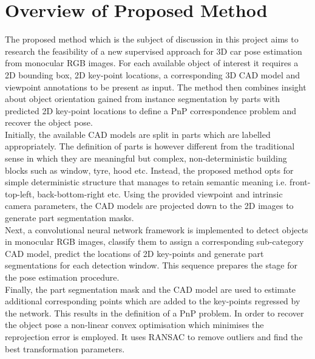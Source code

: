 \documentclass[main.tex]{subfiles}
\begin{document}
\section{Overview of Proposed Method}
\indent The proposed method which is the subject of discussion in this project aims to research the feasibility of a new supervised approach for 3D car pose estimation from monocular RGB images. For each available object of interest it requires a 2D bounding box, 2D key-point locations, a corresponding 3D CAD model and viewpoint annotations to be present as input. The method then combines insight about object orientation gained from instance segmentation by parts with predicted 2D key-point locations to define a PnP correspondence problem and recover the object pose.\\
\indent Initially, the available CAD models are split in parts which are labelled appropriately. The definition of parts is however different from the traditional sense in which they are meaningful but complex, non-deterministic building blocks such as window, tyre, hood etc. Instead, the proposed method opts for simple deterministic structure that manages to retain semantic meaning i.e. front-top-left, back-bottom-right etc. Using the provided viewpoint and intrinsic camera parameters, the CAD models are projected down to the 2D images to generate part segmentation masks.\\
\indent Next, a convolutional neural network framework is implemented to detect objects in monocular RGB images, classify them to assign a corresponding sub-category CAD model, predict the locations of 2D key-points and generate part segmentations for each detection window. This sequence prepares the stage for the pose estimation procedure.\\
\indent Finally, the part segmentation mask and the CAD model are used to estimate additional corresponding points which are added to the key-points regressed by the network. This results in the definition of a PnP problem. In order to recover the object pose a non-linear convex optimisation which minimises the reprojection error is employed. It uses RANSAC to remove outliers and find the best transformation parameters.\\
\indent 
\end{document}
